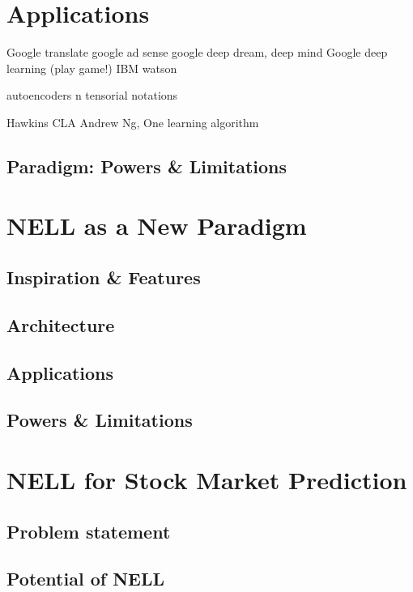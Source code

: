 \documentclass[12pt]{article}  %
\begin{document}
\section{Applications}
Google translate
google ad sense
google deep dream, deep mind
Google deep learning (play game!)
IBM watson



autoencoders n tensorial notations


Hawkins
CLA
Andrew Ng, One learning algorithm





\subsection{Paradigm: Powers \& Limitations}



\section{NELL as a New Paradigm}

\subsection{Inspiration \& Features}
\subsection{Architecture}
\subsection{Applications}
\subsection{Powers \& Limitations}



\section{NELL for Stock Market Prediction}

\subsection{Problem statement}
\subsection{Potential of NELL}
\end{document}
